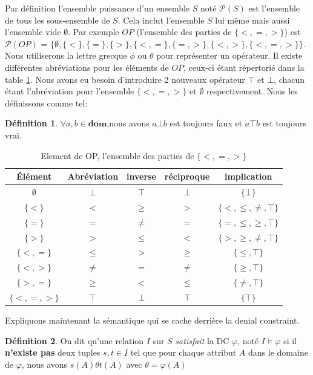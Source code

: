 \documentclass[letterpaper, 12pt]{report}
\theoremstyle{definition}
\newtheorem{mydef}{Définition}
\begin{document}
Par définition l'ensemble puissance d'un ensemble $S$ noté $\mathcal{P}(S)$ est l'ensemble de tous les sous-ensemble de $S$. Cela inclut l'ensemble $S$ lui même mais aussi l'ensemble vide $\emptyset$. Par exemple $OP$ (l'ensemble des parties de $\{ <, =, > \}$) est $\mathcal{P}(OP)$ = $\{ \emptyset, \{<\} , \{=\}, \{>\}, \{<,=\}, \{=,>\}, \{<,>\}, \{<,=,>\} \}$. Nous utiliserons la lettre grecque $\phi$ ou $\theta$ pour représenter un opérateur. Il existe différentes abréviations pour les éléments de $OP$, ceux-ci étant répertorié dans la table \ref{operatorTable}. Nous avons eu besoin d'introduire 2 nouveaux opérateur $\top$ et $\bot$, chacun étant l'abréviation pour l'ensemble $\{<,=,>\}$ et $\emptyset$ respectivement. Nous les définissons comme tel: 
\begin{mydef}$ \forall a,b \in \mathbf{dom}$,nous avons $a \bot b$ est toujours faux et $a \top b$ est toujours vrai. 
\end{mydef}

\begin{table}
	\begin{center}
	\begin{tabular}{|c|c|c|c|c|}\hline
	Élément & Abréviation & inverse & réciproque & implication\\\hline\hline
	$\emptyset$ & $\bot$ & $\top$ & $\bot$ & $\{\bot\}$\\\hline
	$\{<\}$     & $<$ & $\geq$ & $>$ & $\{<,\leq,\neq, \top \}$\\\hline
	$\{=\}$     & $=$ & $\neq$ & $=$ & $\{=,\leq,\geq, \top \}$\\\hline
	$\{>\}$     & $>$ & $\leq$ & $<$ & $\{ >,\geq,\neq,\top \}$\\\hline 
	$\{<,=\}$   & $\leq$ & $>$ & $\geq$ & $\{\leq, \top \}$\\\hline 
	$\{<,>\}$   & $\neq$ & $=$ & $\neq$ & $\{\geq, \top \}$\\\hline
	$\{>,=\}$   & $\geq$ & $<$& $\leq$ & $\{\neq, \top \}$\\\hline 
	$\{<,=,>\}$ & $\top$ & $\bot$ & $\top$ & $\{\top \}$\\\hline
	\end{tabular}
	\end{center}
	\caption{Element de OP, l'ensemble des parties de $\{ <,=,>\}$ \label{operatorTable}}
\end{table}

Expliquons maintenant la sémantique qui se cache derrière la denial constraint.

\begin{mydef}
On dit qu'une relation $I$ sur $S$ \emph{satisfait} la DC $\varphi$, noté $I \models \varphi$ si il \textbf{n'existe pas} deux tuples $s,t \in I$ tel que pour chaque attribut $A$ dans le domaine de $\varphi$, nous avons $s(A)\theta t(A)$ avec $\theta =  \varphi(A)$ 
\end{mydef}
\end{document}
